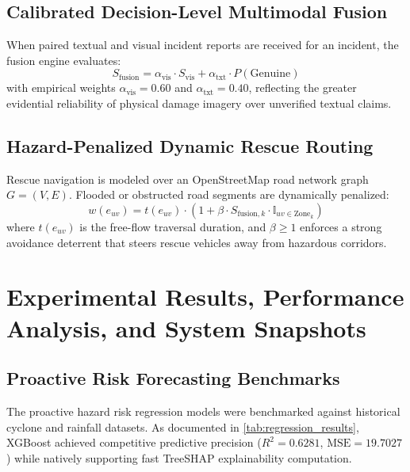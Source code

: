 \documentclass{article}
\begin{document}
\subsection{Calibrated Decision-Level Multimodal Fusion}
When paired textual and visual incident reports are received for an incident, the fusion engine evaluates:
\begin{equation}
S_{\text{fusion}} = \alpha_{\text{vis}} \cdot S_{\text{vis}} + \alpha_{\text{txt}} \cdot P(\text{Genuine})
\end{equation}
with empirical weights $\alpha_{\text{vis}} = 0.60$ and $\alpha_{\text{txt}} = 0.40$, reflecting the greater evidential reliability of physical damage imagery over unverified textual claims.

\subsection{Hazard-Penalized Dynamic Rescue Routing}
Rescue navigation is modeled over an OpenStreetMap road network graph $G = (V, E)$. Flooded or obstructed road segments are dynamically penalized:
\begin{equation}
w(e_{uv}) = t(e_{uv}) \cdot \left( 1 + \beta \cdot S_{\text{fusion}, k} \cdot \mathbb{I}_{uv \in \text{Zone}_k} \right)
\end{equation}
where $t(e_{uv})$ is the free-flow traversal duration, and $\beta \ge 1$ enforces a strong avoidance deterrent that steers rescue vehicles away from hazardous corridors.

\section{Experimental Results, Performance Analysis, and System Snapshots}
\subsection{Proactive Risk Forecasting Benchmarks}
The proactive hazard risk regression models were benchmarked against historical cyclone and rainfall datasets. As documented in \cref{tab:regression_results}, XGBoost achieved competitive predictive precision ($R^2 = 0.6281$, $\text{MSE} = 19.7027$) while natively supporting fast TreeSHAP explainability computation.
\end{document}
